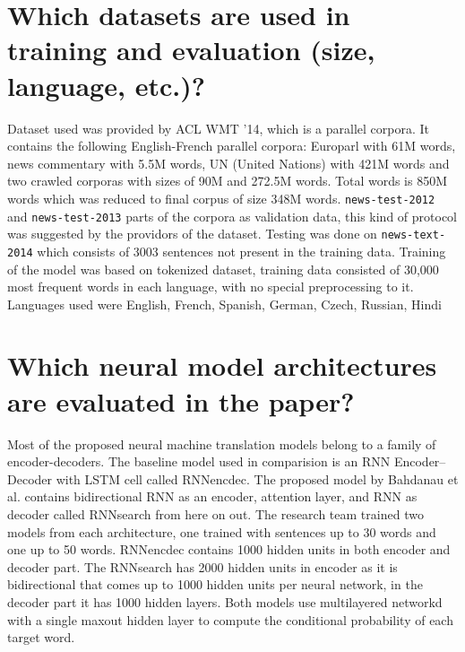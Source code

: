 \documentclass{article}
\begin{document}
\pagestyle{fancy}
\fancyhead{} %


\section{Which datasets are used in training and evaluation (size, language, etc.)?}
Dataset used was provided by ACL WMT ’14, which is a parallel corpora. It contains the following English-French parallel corpora: Europarl with 61M words, news commentary with 5.5M words, UN (United Nations) with 421M words and two crawled corporas with sizes of 90M and 272.5M words. Total words is 850M words which was reduced to final corpus of size 348M words.
\verb|news-test-2012| and \verb|news-test-2013| parts of the corpora as validation data, this kind of protocol was suggested by the providors of the dataset. Testing was done on \verb|news-text-2014| which consists of 3003 sentences not present in the training data. Training of the model was based on tokenized dataset, training data consisted of 30,000 most frequent words in each language, with no special preprocessing to it. Languages used were English, French, Spanish, German, Czech, Russian, Hindi 



\section{Which neural model architectures are evaluated in the paper?}
Most of the proposed neural machine translation models belong to a family of encoder-decoders.
The baseline model used in comparision is an RNN Encoder–Decoder with LSTM cell called RNNencdec. The proposed model by Bahdanau et al. contains bidirectional RNN as an encoder, attention layer, and RNN as decoder called RNNsearch from here on out.
The research team trained two models from each architecture, one trained with sentences up to 30 words and one up to 50 words. RNNencdec contains 1000 hidden units in both encoder and decoder part. The RNNsearch has 2000 hidden units in encoder as it is bidirectional that comes up to 1000 hidden units per neural network, in the decoder part it has 1000 hidden layers. 
Both models use multilayered networkd with a single maxout hidden layer to compute the conditional probability of each target word.
\end{document}
